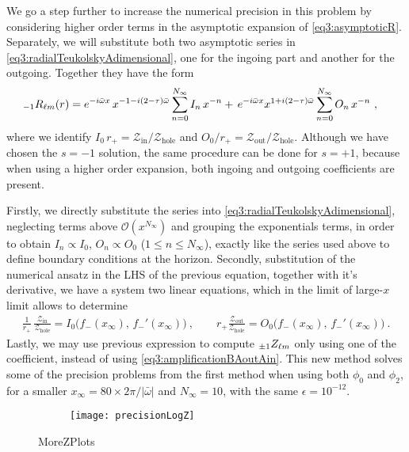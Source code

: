 We go a step further to increase the numerical precision in this problem by considering higher order terms in the asymptotic expansion of \eqref{eq3:asymptoticR}.
Separately, we will substitute both two asymptotic series in \eqref{eq3:radialTeukolskyAdimensional}, one for the ingoing part and another for the outgoing.
Together they have the form
\begin{align}
	\label{eq4:radialIOseries}
	\uu[-1]{R}{\ell m}(r) &= e^{-i \bar{\omega} x}  \, x^{ - 1 - i (2-\tau) \bar{\omega} } \sum_{n=0}^{N_\infty} I_n \, x^{-n} + \, e^{-i \bar{\omega} x} x^{ 1 + i (2-\tau) \bar{\omega} } \sum_{n=0}^{N_\infty} O_n \, x^{-n} ~,
\end{align}
where we identify $I_0 \,r_{+} = \mathscr{Z}_\mathrm{in}/ \mathscr{Z}_\mathrm{hole}$ and $O_0/r_{+} = \mathscr{Z}_\mathrm{out}/\mathscr{Z}_\mathrm{hole}$.
Although we have chosen the $s=-1$ solution, the same procedure can be done for $s=+1$, because when using a higher order expansion, both ingoing and outgoing coefficients are present.

Firstly, we directly substitute the series into \eqref{eq3:radialTeukolskyAdimensional}, neglecting terms above $\mathscr{O}(x^{N_\infty})$ and grouping the exponentials terms, in order to obtain $I_n\propto I_0$, $O_n\propto O_0$ ($1 \le n \le N_\infty$), exactly like the series used above to define boundary conditions at the horizon.
Secondly, substitution of the numerical ansatz  in the LHS of the previous equation, together with it's derivative, we have a system two linear equations, which in the limit of large-$x$ limit allows to determine
\begin{align}
	\frac{1}{r_+} \,\frac{\mathscr{Z}_\mathrm{in}}{\mathscr{Z}_\mathrm{hole}} = I_0\Big( f_{-}(x_\infty), \,f_{-}{\!}'(x_\infty) \Big) ~,\qquad r_{+} \frac{\mathscr{Z}_\mathrm{out}}{\mathscr{Z}_\mathrm{hole}} = O_0\Big( f_{-}(x_\infty), \, f_{-}{\!}'(x_\infty) \Big) ~.
\end{align}
Lastly, we may use previous expression  to compute $\uu[\pm1]{Z}{\ell m}$ only using one of the coefficient, instead of using \eqref{eq3:amplificationBAoutAin}. 
This new method solves some of the precision problems from the first method when using both $\phi_0$ and $\phi_2$, for a smaller $x_\infty = 80 \times 2 \pi / |\bar{\omega}|$ and $N_\infty = 10$, with the same $\epsilon = 10^{-12}$.
\begin{figure}[!t]
	\centering
	\vspace{0.2cm}
	\begin{subfigure}[c]{0.9\textwidth}
        \texttt{[image: precisionLogZ]}
	\end{subfigure}
	\caption{MoreZPlots}
	\label{fig4:logZ}
\end{figure}


\cleardoublepage